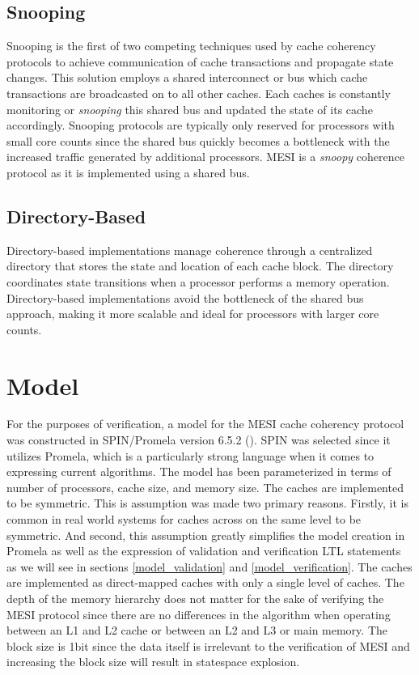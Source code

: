 \documentclass[12pt]{article}
\begin{document}
\subsection{Snooping}

Snooping is the first of two competing techniques used by cache coherency protocols to achieve communication of cache transactions and propagate state changes. This solution employs a shared interconnect or bus which cache transactions are broadcasted on to all other caches. Each caches is constantly monitoring or \textit{snooping} this shared bus and updated the state of its cache accordingly. Snooping protocols are typically only reserved for processors with small core counts since the shared bus quickly becomes a bottleneck with the increased traffic generated by additional processors. MESI is a \textit{snoopy} coherence protocol as it is implemented using a shared bus.

\subsection{Directory-Based}

Directory-based implementations manage coherence through a centralized directory that stores the state and location of each cache block. The directory coordinates state transitions when a processor performs a memory operation. Directory-based implementations avoid the bottleneck of the shared bus approach, making it more scalable and ideal for processors with larger core counts.

\section{Model} \label{model}

For the purposes of verification, a model for the MESI cache coherency protocol was constructed in SPIN/Promela version 6.5.2 (\cite{spin}). SPIN was selected since it utilizes Promela, which is a particularly strong language when it comes to expressing current algorithms. The model has been parameterized in terms of number of processors, cache size, and memory size. The caches are implemented to be symmetric. This is assumption was made two primary reasons. Firstly, it is common in real world systems for caches across on the same level to be symmetric. And second, this assumption greatly simplifies the model creation in Promela as well as the expression of validation and verification LTL statements as we will see in sections \ref{model_validation} and \ref{model_verification}. The caches are implemented as direct-mapped caches with only a single level of caches. The depth of the memory hierarchy does not matter for the sake of verifying the MESI protocol since there are no differences in the algorithm when operating between an L1 and L2 cache or between an L2 and L3 or main memory. The block size is 1bit since the data itself is irrelevant to the verification of MESI and increasing the block size will result in statespace explosion.
\end{document}
